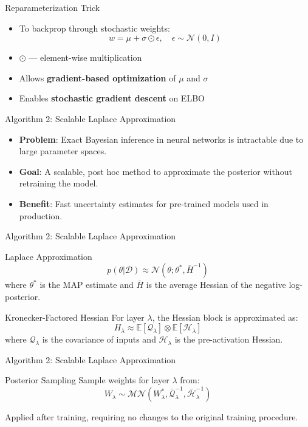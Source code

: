 \documentclass[10pt]{beamer}
\begin{document}
\begin{frame}{Reparameterization Trick}
\begin{itemize}
    \item To backprop through stochastic weights:
\[
w = \mu + \sigma \odot \epsilon, \quad \epsilon \sim \mathcal{N}(0, I)
\]
    \item $\odot$ — element-wise multiplication
    \item Allows \textbf{gradient-based optimization} of $\mu$ and $\sigma$
    \item Enables \textbf{stochastic gradient descent} on ELBO
\end{itemize}
\end{frame}



\begin{frame}{Algorithm 2: Scalable Laplace Approximation}
\begin{itemize}
    \item \textbf{Problem}: Exact Bayesian inference in neural networks is intractable due to large parameter spaces.
    \item \textbf{Goal}: A scalable, post hoc method to approximate the posterior without retraining the model.
    \item \textbf{Benefit}: Fast uncertainty estimates for pre-trained models used in production.
\end{itemize}
\end{frame}

\begin{frame}{Algorithm 2: Scalable Laplace Approximation}
\begin{block}{Laplace Approximation}
\[
p(\theta | \mathcal{D}) \approx \mathcal{N}(\theta; \theta^* , \bar{H}^{-1})
\]
where $\theta^*$ is the MAP estimate and $\bar{H}$ is the average Hessian of the negative log-posterior.
\end{block}

\begin{block}{Kronecker-Factored Hessian}
For layer $\lambda$, the Hessian block is approximated as:
\[
H_{\lambda} \approx \mathbb{E}[\mathcal{Q}_{\lambda}] \otimes \mathbb{E}[\mathcal{H}_{\lambda}]
\]
where $\mathcal{Q}_{\lambda}$ is the covariance of inputs and $\mathcal{H}_{\lambda}$ is the pre-activation Hessian.
\end{block}
\end{frame}

\begin{frame}{Algorithm 2: Scalable Laplace Approximation}


\begin{block}{Posterior Sampling}
Sample weights for layer $\lambda$ from:
\[
W_{\lambda} \sim \mathcal{MN}(W_{\lambda}^*, \bar{\mathcal{Q}}_{\lambda}^{-1}, \bar{\mathcal{H}}_{\lambda}^{-1})
\]
\end{block}
Applied after training, requiring no changes to the original training procedure.
\end{frame}
\end{document}
